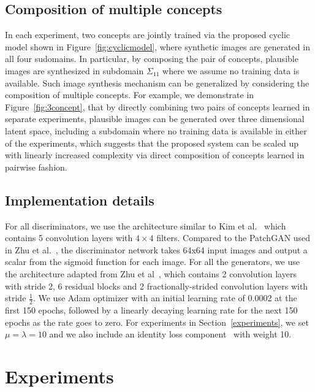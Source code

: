 \documentclass[10pt,twocolumn,letterpaper]{article}
\begin{document}
\subsection{Composition of multiple concepts}
\label{sec:multiple}
In each experiment, two concepts are jointly trained via the proposed cyclic model shown in Figure~\ref{fig:cyclicmodel}, where synthetic images are generated in all four sudomains. In particular, by composing the pair of concepts, plausible images are synthesized in subdomain $\Sigma_{11}$ where we assume no training data is available. Such image synthesis mechanism can be generalized by considering the composition of multiple concepts. For example, we demonstrate in Figure~\ref{fig:3concept}, that by directly combining two pairs of concepts learned in separate experiments, plausible images can be generated over three dimensional latent space, including a subdomain where no training data is available in either of the experiments, which suggests that the proposed system can be scaled up with linearly increased complexity via direct composition of concepts learned in pairwise fashion.



\subsection{Implementation details} \label{implementation}
For all discriminators, we use the architecture similar to Kim et al.~\cite{DiscoGAN} which contains 5 convolution layers with $4 \times 4$ filters. Compared to the PatchGAN used in Zhu et al.~\cite{CycleGAN}, the discriminator network takes 64x64 input images and output a scalar from the sigmoid function for each image. For all the generators, we use the architecture adapted from Zhu et al~\cite{CycleGAN}, which contains 2 convolution layers with stride 2, 6 residual blocks and 2 fractionally-strided convolution layers with stride $\frac{1}{2}$. We use Adam optimizer \cite{adam} with an initial learning rate of 0.0002 at the first 150 epochs, followed by a linearly decaying learning rate for the next 150 epochs as the rate goes to zero. For experiments in Section~\ref{experiments}, we set $\mu=\lambda=10$ and we also include an identity loss component~\cite{CycleGAN} with weight 10.


\section{Experiments}
\end{document}
